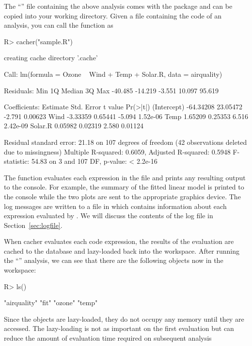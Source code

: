 \documentclass[nojss]{jss}
\begin{document}
The ``'' file containing the above analysis comes with the
 package and can be copied into your working directory.
Given a file containing the code of an analysis, you can call the
 function as
\begin{Schunk}
\begin{Sinput}
R> cacher("sample.R")
\end{Sinput}
\begin{Soutput}
creating cache directory '.cache'

Call:
lm(formula = Ozone ~ Wind + Temp + Solar.R, data = airquality)

Residuals:
    Min      1Q  Median      3Q     Max 
-40.485 -14.219  -3.551  10.097  95.619 

Coefficients:
             Estimate Std. Error t value Pr(>|t|)
(Intercept) -64.34208   23.05472  -2.791  0.00623
Wind         -3.33359    0.65441  -5.094 1.52e-06
Temp          1.65209    0.25353   6.516 2.42e-09
Solar.R       0.05982    0.02319   2.580  0.01124

Residual standard error: 21.18 on 107 degrees of freedom
  (42 observations deleted due to missingness)
Multiple R-squared: 0.6059,	Adjusted R-squared: 0.5948 
F-statistic: 54.83 on 3 and 107 DF,  p-value: < 2.2e-16 
\end{Soutput}
\end{Schunk}
The  function evaluates each expression in the file and
prints any resulting output to the console.  For example, the summary
of the fitted linear model is printed to the console while the two
plots are sent to the appropriate graphics device.  The log messages
are written to a file in  which
contains information about each expression evaluated by .
We will discuss the contents of the log file in
Section~\ref{sec:logfile}.

When cacher evaluates each code expression, the results of the
evaluation are cached to the database and lazy-loaded back into the
workspace.  After running the ``'' analysis, we can see that
there are the following objects now in the workspace:
\begin{Schunk}
\begin{Sinput}
R> ls()
\end{Sinput}
\begin{Soutput}
[1] "airquality" "fit"        "ozone"      "temp"      
\end{Soutput}
\end{Schunk}
Since the objects are lazy-loaded, they do not occupy any memory
until they are accessed.  The lazy-loading is not as important on the
first evaluation but can reduce the amount of evaluation time required
on subsequent analysis
\end{document}

